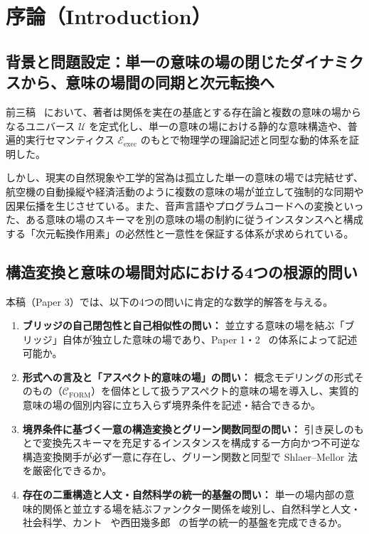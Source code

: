\documentclass[11pt,a4paper]{ltjsarticle}
\theoremstyle{definition}
\theoremstyle{plain}
\theoremstyle{remark}
\newcommand{\CFORM}{\mathcal{C}_{\mathrm{FORM}}}
\newcommand{\Eexec}{\mathcal{E}_{\mathrm{exec}}}
\begin{document}
\section{序論（Introduction）}

\subsection{背景と問題設定：単一の意味の場の閉じたダイナミクスから、意味の場間の同期と次元転換へ}
前三稿~\cite{ota2026paper0,ota2026paper1,ota2026paper2} において、著者は関係を実在の基底とする存在論と複数の意味の場からなるユニバース $\mathcal{U}$ を定式化し、単一の意味の場における静的な意味構造や、普遍的実行セマンティクス $\Eexec$ のもとで物理学の理論記述と同型な動的体系を証明した。

しかし、現実の自然現象や工学的営為は孤立した単一の意味の場では完結せず、航空機の自動操縦や経済活動のように複数の意味の場が並立して強制的な同期や因果伝播を生じさせている。また、音声言語やプログラムコードへの変換といった、ある意味の場のスキーマを別の意味の場の制約に従うインスタンスへと構成する「次元転換作用素」の必然性と一意性を保証する体系が求められている。

\subsection{構造変換と意味の場間対応における4つの根源的問い}
本稿（Paper 3）では、以下の4つの問いに肯定的な数学的解答を与える。

\begin{enumerate}
    \item \textbf{ブリッジの自己閉包性と自己相似性の問い：} 並立する意味の場を結ぶ「ブリッジ」自体が独立した意味の場であり、Paper 1・2~\cite{ota2026paper1,ota2026paper2} の体系によって記述可能か。
    \item \textbf{形式への言及と「アスペクト的意味の場」の問い：} 概念モデリングの形式そのもの（$\CFORM$）を個体として扱うアスペクト的意味の場を導入し、実質的意味の場の個別内容に立ち入らず境界条件を記述・結合できるか。
    \item \textbf{境界条件に基づく一意の構造変換とグリーン関数同型の問い：} 引き戻しのもとで変換先スキーマを充足するインスタンスを構成する一方向かつ不可逆な構造変換関手が必ず一意に存在し、グリーン関数と同型で Shlaer--Mellor 法~\cite{shlaer1992,mellor2002} を厳密化できるか。
    \item \textbf{存在の二重構造と人文・自然科学の統一的基盤の問い：} 単一の場内部の意味的関係と並立する場を結ぶファンクター関係を峻別し、自然科学と人文・社会科学、カント~\cite{kant1781} や西田幾多郎~\cite{nishida1911,nishida1927} の哲学の統一的基盤を完成できるか。
\end{enumerate}
\end{document}
